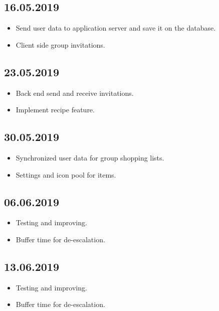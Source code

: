 \documentclass[12pt]{article}
\theoremstyle{definition}
\begin{document}
\subsection{16.05.2019}
\begin{itemize}
\item Send user data to application server and save it on the database.
\item Client side group invitations.
\end{itemize}
\subsection{23.05.2019}
\begin{itemize}
\item Back end send and receive invitations.
\item Implement recipe feature.
\end{itemize}
\subsection{30.05.2019}
\begin{itemize}
\item Synchronized user data for group shopping lists.
\item Settings and icon pool for items.
\end{itemize}
\subsection{06.06.2019}
\begin{itemize}
\item Testing and improving.
\item Buffer time for de-escalation. 
\end{itemize}
\subsection{13.06.2019}
\begin{itemize}
\item Testing and improving.
\item Buffer time for de-escalation. 
\end{itemize}
\end{document}
